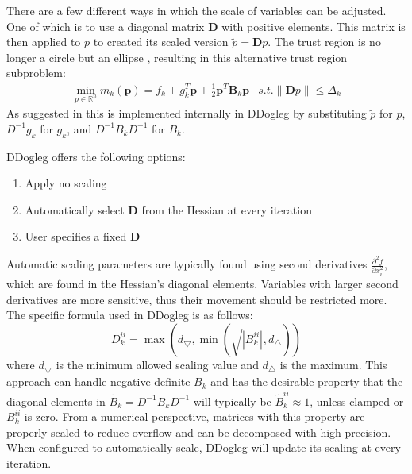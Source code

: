 \documentclass[peerreview,onecolumn]{IEEEtran}
\newcommand{\R}{\mathbb{R}}
\newcommand{\norm}[1]{\left\lVert#1\right\rVert}
\begin{document}
There are a few different ways in which the scale of variables can be adjusted. One of which is to use a diagonal matrix $\bm{D}$ with positive elements. This matrix is then applied to $p$ to created its scaled version $\tilde{p} = \bm{D}p$. The trust region is no longer a circle but an ellipse \cite{numopt2006}, resulting in this alternative trust region subproblem:
\begin{equation}
\begin{array}{lr}
\min\limits_{p\in \R^n} m_k(\bm{p}) = f_k + g^T_k \bm{p} + \frac{1}{2}\bm{p}^T \bm{B}_k \bm{p} & s.t. \norm{\bm{D}p} \le \Delta_k
\end{array}
\end{equation}
As suggested in \cite{numopt2006} this is implemented internally in DDogleg by substituting $\tilde{p}$ for $p$, $D^{-1}g_k$ for $g_k$, and $D^{-1}B_k D^{-1}$ for $B_k$.  

DDogleg offers the following options:
\begin{center}
\begin{minipage}[c]{0.7\textwidth}
\begin{enumerate}
\item Apply no scaling
\item Automatically select $\bm{D}$ from the Hessian at every iteration
\item User specifies a fixed $\bm{D}$ 
\end{enumerate}
\end{minipage}
\end{center}
Automatic scaling parameters are typically found using second derivatives $\frac{\partial^2 f}{\partial x^2_i}$, which are found in the Hessian's diagonal elements. Variables with larger second derivatives are more sensitive, thus their movement should be restricted more. The specific formula used in DDogleg is as follows:
\begin{equation}
D_k^{ii} = \max\left( d_{\bigtriangledown},\min\left( \sqrt{|B_k^{ii}|} , d_{\bigtriangleup} \right)\right)
\end{equation}
where $d_{\bigtriangledown}$ is the minimum allowed scaling value and $d_{\bigtriangleup}$ is the maximum. This approach can handle negative definite $B_k$ and has the desirable property \cite{dennis1996} that the diagonal elements in $\tilde{B}_k = D^{-1}B_k D^{-1}$ will typically be $\tilde{B}_k^{ii} \approx 1$, unless clamped or $B_k^{ii}$ is zero. From a numerical perspective, matrices with this property are properly scaled to reduce overflow and can be decomposed with high precision. When configured to automatically scale, DDogleg will update its scaling at every iteration.
\end{document}
